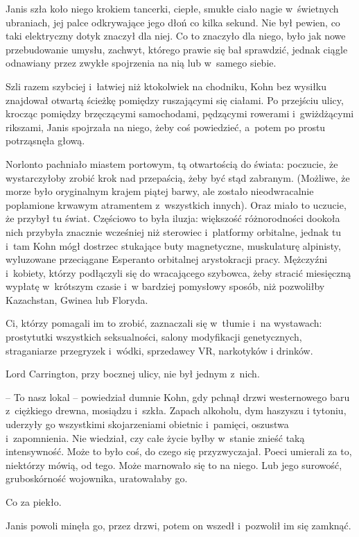 \documentclass[oneside,polish,11pt,sfheadings]{mwbk}
\begin{document}
Janis szła koło niego krokiem tancerki, ciepłe, smukłe ciało nagie w~świetnych ubraniach, jej palce odkrywające jego dłoń co kilka sekund.
Nie był pewien, co taki elektryczny dotyk znaczył dla niej. Co to
znaczyło dla niego, było jak nowe przebudowanie umysłu, zachwyt, którego
prawie się bał sprawdzić, jednak ciągle odnawiany przez zwykłe
spojrzenia na nią lub w~samego siebie.

Szli razem szybciej i~łatwiej niż ktokolwiek na chodniku, Kohn bez
wysiłku znajdował otwartą ścieżkę pomiędzy ruszającymi się ciałami. Po
przejściu ulicy, krocząc pomiędzy brzęczącymi samochodami, pędzącymi
rowerami i~gwiżdżącymi rikszami, Janis spojrzała na niego, żeby coś
powiedzieć, a~potem po prostu potrząsnęła głową.

Norlonto pachniało miastem portowym, tą otwartością do świata: poczucie,
że wystarczyłoby zrobić krok nad przepaścią, żeby być stąd zabranym.
(Możliwe, że morze było oryginalnym krajem piątej barwy, ale zostało
nieodwracalnie poplamione krwawym atramentem z~wszystkich innych). Oraz
miało to uczucie, że przybył tu świat. Częściowo to była iluzja:
większość różnorodności dookoła nich przybyła znacznie wcześniej niż
sterowiec i~platformy orbitalne, jednak tu i~tam Kohn mógł dostrzec
stukające buty magnetyczne, muskulaturę alpinisty, wyluzowane
przeciągane Esperanto orbitalnej arystokracji pracy. Mężczyźni i~kobiety, którzy podłączyli się do wracającego szybowca, żeby stracić
miesięczną wypłatę w~krótszym czasie i~w bardziej pomysłowy sposób, niż
pozwoliłby Kazachstan, Gwinea lub Floryda.

Ci, którzy pomagali im to zrobić, zaznaczali się w~tłumie i~na
wystawach: prostytutki wszystkich seksualności, salony modyfikacji
genetycznych, straganiarze przegryzek i~wódki, sprzedawcy VR, narkotyków
i drinków.

Lord Carrington, przy bocznej ulicy, nie był jednym z~nich.

-- To nasz lokal -- powiedział dumnie Kohn, gdy pchnął drzwi westernowego
baru z~ciężkiego drewna, mosiądzu i~szkła. Zapach alkoholu, dym haszyszu
i tytoniu, uderzyły go wszystkimi skojarzeniami obietnic i~pamięci,
oszustwa i~zapomnienia. Nie wiedział, czy całe życie byłby w~stanie
znieść taką intensywność. Może to było coś, do czego się przyzwyczajał.
Poeci umierali za to, niektórzy mówią, od tego. Może marnowało się to na
niego. Lub jego surowość, gruboskórność wojownika, uratowałaby go.

Co za piekło.

Janis powoli minęła go, przez drzwi, potem on wszedł i~pozwolił im się
zamknąć.
\end{document}
